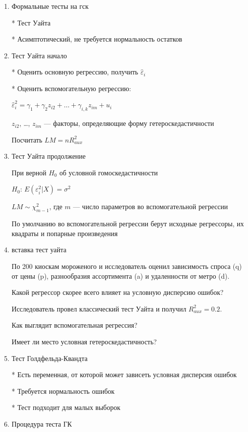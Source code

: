 \documentclass[12pt,a4paper]{article}
\begin{document}
{\begin{enumerate}
* Графическое

\item Формальные тесты на гск

* Тест Уайта

* Асимптотический, не требуется нормальность остатков

\item Тест Уайта  начало

* Оценить основную регрессию, получить $\hat{\varepsilon}_i$

* Оценить вспомогательную регрессию:

$\hat{\varepsilon}^2_i = \gamma_1 + \gamma_2 z_{i2} + \ldots + \gamma_{i,k} z_{im}+ u_i$

$z_{i2}$, \ldots, $z_{im}$ --- факторы, определяющие форму гетероскедастичности

Посчитать $LM=nR^2_{aux}$

\newpage
\item Тест Уайта продолжение

При верной $H_0$ об условной гомоскедастичности

$H_0$: $E(\varepsilon^2_i|X)=\sigma^2$

$LM \sim \chi^2_{m-1}$, где $m$ --- число параметров во вспомогательной регрессии

По умолчанию во вспомогательной регрессии берут исходные регрессоры, их квадраты и попарные произведения

\item вставка тест уайта

По 200 киоскам мороженого и  исследователь оценил зависимость спроса (q) от цены (p), разнообразия ассортимента (a) и удаленности от метро (d).

Какой регрессор скорее всего влияет на условную дисперсию ошибок?

Исследователь провел классический тест Уайта и получил $R^2_{aux}=0.2$.

Как выглядит вспомогательная регрессия?

Имеет ли место условная гетероскедастичность?

\newpage
\item Тест Голдфельда-Квандта

* Есть переменная, от которой может зависеть условная дисперсия ошибок

* Требуется нормальность ошибок

* Тест подходит для малых выборок

\item Процедура теста ГК


\end{enumerate}}
\end{document}
